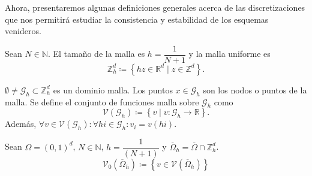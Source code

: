 Ahora, presentaremos algunas definiciones generales acerca de las
discretizaciones que nos permitirá estudiar la consistencia y
estabilidad de los esquemas venideros.

\begin{definition}
    Sean $N\in\mathbb{N}$.
    El tamaño de la malla es
    \begin{math}
        h=\dfrac{1}{N+1}
    \end{math} y la malla uniforme es
    \begin{equation*}
        \mathbb{Z}^{d}_{h}\coloneqq
        \left\{
        hz\in\mathbb{R}^{d}\mid
        z\in\mathbb{Z}^{d}
        \right\}.
    \end{equation*}
\end{definition}

\begin{definition}
    \begin{math}
        \emptyset\neq\mathcal{G}_{h}\subset\mathbb{Z}^{d}_{h}
    \end{math}
    es un dominio malla.
    Los puntos $x\in\mathcal{G}_{h}$ son los nodos o puntos de la malla.
    Se define el conjunto de funciones malla sobre $\mathcal{G}_{h}$
    como
    \begin{equation*}
        \mathcal{V}
        \left(\mathcal{G}_{h}\right)\coloneqq
        \left\{
        v\mid v\colon\mathcal{G}_{h}\to\mathbb{R}
        \right\}.
    \end{equation*}
    Además,
    \begin{math}
        \forall v\in\mathcal{V}\left(\mathcal{G}_{h}\right):
        \forall hi\in\mathcal{G}_{h}:
        v_{i}=v\left(hi\right)
    \end{math}.
\end{definition}

\begin{definition}
    Sean
    \begin{math}
        \Omega=
        {\left(0,1\right)}^{d}
    \end{math},
    \begin{math}
        N\in\mathbb{N}
    \end{math},
    \begin{math}
        h=\dfrac{1}{\left(N+1\right)}
    \end{math}
    y
    \begin{math}
        \overline{\Omega}_{h}=
        \overline{\Omega}\cap
        \mathbb{Z}^{d}_{h}
    \end{math}.
    \begin{equation*}
        \mathcal{V}_{0}\left(\overline{\Omega}_{h}\right)\coloneqq
        \left\{
        v\in\mathcal{V}\left(\overline{\Omega}_{h}\right)
        \right\}
    \end{equation*}
\end{definition}

